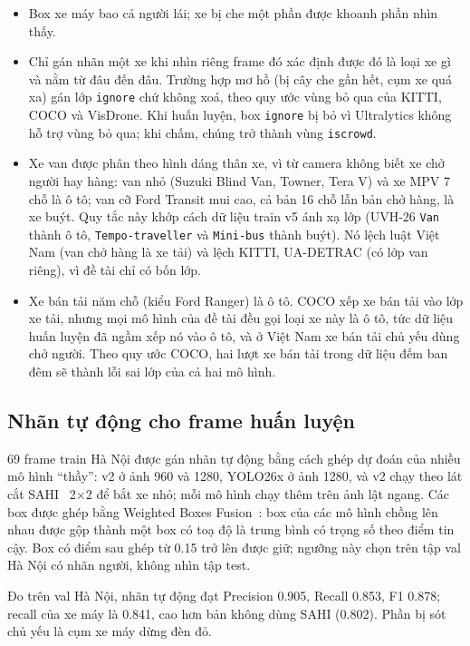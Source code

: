 \begin{itemize}
  \item Box xe máy bao cả người lái; xe bị che một phần được khoanh phần nhìn thấy.
  \item Chỉ gán nhãn một xe khi nhìn riêng frame đó xác định được đó là loại xe gì và nằm từ đâu đến đâu. Trường hợp mơ
        hồ (bị cây che gần hết, cụm xe quá xa) gán lớp \texttt{ignore} chứ không xoá, theo quy ước vùng bỏ qua của KITTI,
        COCO và VisDrone. Khi huấn luyện, box \texttt{ignore} bị bỏ vì Ultralytics không hỗ trợ vùng bỏ qua; khi chấm, chúng
        trở thành vùng \texttt{iscrowd}.
  \item Xe van được phân theo hình dáng thân xe, vì từ camera không biết xe chở người hay hàng: van nhỏ (Suzuki
        Blind Van, Towner, Tera V) và xe MPV 7 chỗ là ô tô; van cỡ Ford Transit mui cao, cả bản 16 chỗ lẫn bản chở hàng, là
        xe buýt. Quy tắc này khớp cách dữ liệu train v5 ánh xạ lớp (UVH-26 \texttt{Van} thành ô tô,
        \texttt{Tempo-traveller} và \texttt{Mini-bus} thành buýt). Nó lệch luật Việt Nam (van chở hàng là xe tải) và lệch
        KITTI, UA-DETRAC (có lớp van riêng), vì đề tài chỉ có bốn lớp.
  \item Xe bán tải năm chỗ (kiểu Ford Ranger) là ô tô. COCO xếp xe bán tải vào lớp xe tải, nhưng mọi mô hình
        của đề tài đều gọi loại xe này là ô tô, tức dữ liệu huấn luyện đã ngầm xếp nó vào ô tô, và ở Việt Nam xe bán tải
        chủ yếu dùng chở người. Theo quy ước COCO, hai lượt xe bán tải trong dữ liệu đếm ban đêm sẽ thành lỗi sai lớp
        của cả hai mô hình.
\end{itemize}

\subsection{Nhãn tự động cho frame huấn luyện}

69 frame train Hà Nội được gán nhãn tự động bằng cách ghép dự đoán của nhiều mô hình ``thầy'': v2 ở ảnh 960 và 1280,
YOLO26x ở ảnh 1280, và v2 chạy theo lát cắt SAHI~\cite{akyon2022sahi} 2×2 để bắt xe nhỏ; mỗi mô hình chạy thêm trên
ảnh lật ngang. Các box được ghép bằng Weighted Boxes Fusion~\cite{solovyev2021wbf}: box của các mô hình chồng lên nhau
được gộp thành một box có toạ độ là trung bình có trọng số theo điểm tin cậy. Box có điểm sau ghép từ 0.15 trở lên
được giữ; ngưỡng này chọn trên tập val Hà Nội có nhãn người, không nhìn tập test.

Đo trên val Hà Nội, nhãn tự động đạt Precision 0.905, Recall 0.853, F1 0.878; recall của xe máy là 0.841, cao hơn bản
không dùng SAHI (0.802). Phần bị sót chủ yếu là cụm xe máy dừng đèn đỏ.


